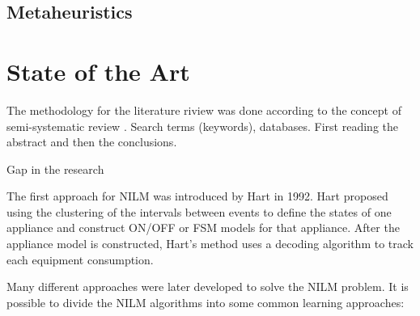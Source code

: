 \subsection{Metaheuristics}


\section{State of the Art}


The methodology for the literature riview was done according to the concept of semi-systematic review \cite{LiteratureReview}. Search terms (keywords), databases. First reading the abstract and then the conclusions.

Gap in the research

The first approach for NILM was introduced by Hart in 1992. Hart proposed using the clustering of the intervals between events to define the states of one appliance and construct ON/OFF or FSM models for that appliance. After the appliance model is constructed, Hart's method uses a decoding algorithm to track each equipment consumption.

Many different approaches were later developed to solve the NILM problem. It is possible to divide the NILM algorithms into some common learning approaches:

